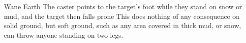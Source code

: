   {}%
  {Wane}%
  {Earth}%
  {}%
  {The caster points to the target's foot while they stand on snow or mud, and the target then falls prone}%
  {
    This does nothing of any consequence on solid ground, but soft ground, such as any area covered in thick mud, or snow, can throw anyone standing on two legs.}

